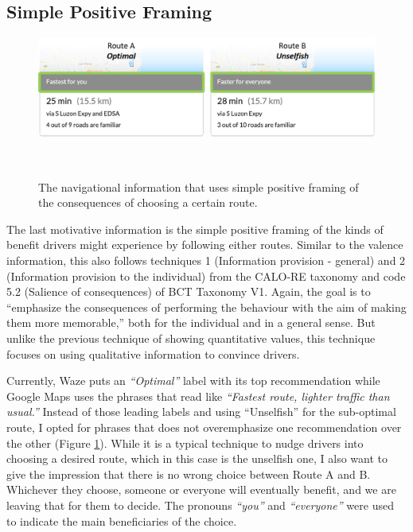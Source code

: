 \subsection{Simple Positive Framing}

\begin{figure}[h]
\centering
  \includegraphics[scale=0.4]{figures/s3-framing.png}
  \caption{The navigational information that uses simple positive framing of the consequences of choosing a certain route.}~\label{fig:s3-framing}
\end{figure}

The last motivative information is the simple positive framing of the kinds of benefit drivers might experience by following either routes. Similar to the valence information, this also follows techniques 1 (Information provision - general) and 2 (Information provision to the individual) from the CALO-RE taxonomy\cite{michie2011refined} and code 5.2 (Salience of consequences) of BCT Taxonomy V1\cite{michie2013behavior}. Again, the goal is to ``emphasize the consequences of performing the behaviour with the aim of making them more memorable,''\cite{michie2013behavior} both for the individual and in a general sense. But unlike the previous technique of showing quantitative values, this technique focuses on using qualitative information to convince drivers.

Currently, Waze puts an \textit{``Optimal''} label with its top recommendation while Google Maps uses the phrases that read like \textit{``Fastest route, lighter traffic than usual.''} Instead of those leading labels and using ``Unselfish'' for the sub-optimal route, I opted for phrases that does not overemphasize one recommendation over the other (Figure \ref{fig:s3-framing}). While it is a typical technique to nudge drivers into choosing a desired route, which in this case is the unselfish one, I also want to give the impression that there is no wrong choice between Route A and B. Whichever they choose, someone or everyone will eventually benefit, and we are leaving that for them to decide. The pronouns \textit{``you''} and \textit{``everyone''} were used to indicate the main beneficiaries of the choice. 

